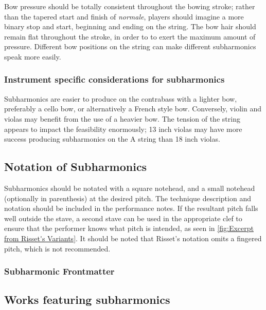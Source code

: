 Bow pressure should be totally consistent throughout the bowing stroke; rather than the tapered start and finish of \emph{normale}, players should imagine a more binary stop and start, beginning and ending on the string.
The bow hair should remain flat throughout the stroke, in order to to exert the maximum amount of pressure.\autocite[]{kimuraHowProduceSubharmonics1999}
Different bow positions on the string can make different subharmonics speak more easily.\autocite[]{kimuraHowProduceSubharmonics1999}

\subsubsection{Instrument specific considerations for subharmonics}
Subharmonics are easier to produce on the contrabass with a lighter bow, preferably a cello bow, or alternatively a French style bow.\autocite[]{longSubharmonics2019}
Conversely, violin and violas may benefit from the use of a heavier bow.\autocite[]{appleseedFeedbackSightreadingSession2019}
The tension of the string appears to impact the feasibility enormously; 13 inch violas may have more success producing subharmonics on the A string than 18 inch violas.\autocite[]{appleseedFeedbackSightreadingSession2019}



\subsection{Notation of Subharmonics}\label{sec:notation-subharmonics}
Subharmonics should be notated with a square notehead, and a small notehead (optionally in parenthesis) at the desired pitch.
The technique description and notation should be included in the performance notes.
If the resultant pitch falls well outside the stave, a second stave can be used in the appropriate clef to ensure that the performer knows what pitch is intended, as seen in \autoref{fig:Excerpt from Risset's Variants}.\autocite[]{rissetVariants1995}
It should be noted that Risset's notation omits a fingered pitch, which is not recommended.

\subsubsection{Subharmonic Frontmatter}\label{sec:subharmonicFrontmatter}

\subsection{Works featuring subharmonics }\label{sec:subharmonicsLiterature}

